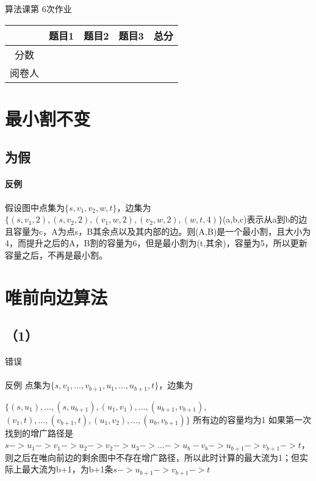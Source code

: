 \documentclass[a4paper,10pt]{article}
\begin{document}
\begin{center}
\LARGE 算法课第 6次作业
\end{center}

\begin{center}
 \begin{tabular}{|c|c|c|c|c|}
\hline
      & 题目1 & 题目2 & 题目3 & 总分\\ \hline
 \multirow{2}{*}{分数} &\multirow{2}{*}{} &\multirow{2}{*}{} &\multirow{2}{*}{} &\multirow{2}{*}{}\\
 & & & & \\ \hline
 \multirow{2}{*}{阅卷人} &\multirow{2}{*}{} &\multirow{2}{*}{} &\multirow{2}{*}{} &\multirow{2}{*}{}\\
 & & & &  \\ \hline
\end{tabular}
\end{center}
\vspace{20pt}
\section{最小割不变}
  \normalsize
  \subsection{为假} 
  \paragraph{反例} 假设图中点集为$\{s, v_1, v_2, w, t\}$，边集为$\{(s,v_1,2),(s,v_2,2),(v_1,w,2),(v_2,w,2),(w,t,4)\}$(a,b,c)表示从a到b的边且容量为c，A为点s，B其余点以及其内部的边。则(A,B)是一个最小割，且大小为4，而提升之后的A，B割的容量为6，但是最小割为({t},其余)，容量为5，所以更新容量之后，不再是最小割。
  \vspace{100pt}
\section{唯前向边算法}
  \subsection{（1）} 错误
  \paragraph{}反例
  点集为$\{s, v_1,...,v_{b+1}, u_1,...,u_{b+1}, t\}$，边集为
  
                                                     $\{(s,u_1),...,(s,u_{b+1}),(u_1,v_1),...,(u_{b+1},v_{b+1})$,
                                                     $(v_1,t),...,(v_{b+1},t),(u_1,v_2),...,(u_b,v_{b+1})\}$
  所有边的容量均为1
  如果第一次找到的增广路径是$s->u_1->v_1->u_2->v_2->u_3->...->u_b-v_b->u_{b+1}->v_{b+1}->t$，则之后在唯向前边的剩余图中不存在增广路径，所以此时计算的最大流为1；但实际上最大流为b+1，为b+1条$s->u_{b+1}->v_{b+1}->t$
  \newpage
  \vspace{100pt}
\end{document}
